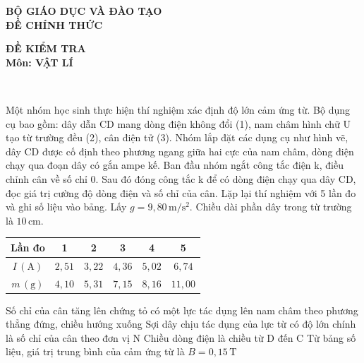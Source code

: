 \documentclass[12pt,a4paper]{article}
\begin{document}
\begin{minipage}[t]{7cm}
	\begin{center}
		\textbf{BỘ GIÁO DỤC VÀ ĐÀO TẠO \\[3pt]
			ĐỀ CHÍNH THỨC}
	\end{center}
\end{minipage}
\hspace{3cm}
\begin{minipage}[t]{7cm}
	\begin{center}
		\textbf{ĐỀ KIỂM TRA\\[3pt]
			Môn: VẬT LÍ}
	\end{center}
\end{minipage}\\[6pt]

\begin{ex}
	Một nhóm học sinh thực hiện thí nghiệm xác định độ lớn cảm ứng từ. Bộ dụng cụ bao gồm: dây dẫn CD mang dòng điện không đổi (1), nam châm hình chữ U tạo từ trường đều (2), cân điện tử (3). Nhóm lắp đặt các dụng cụ như hình vẽ, dây CD được cố định theo phương ngang giữa hai cực của nam châm, dòng điện chạy qua đoạn dây có gắn ampe kế. Ban đầu nhóm ngắt công tắc điện k, điều chỉnh cân về số chỉ 0. Sau đó đóng công tắc k để có dòng điện chạy qua dây CD, đọc giá trị cường độ dòng điện và số chỉ của cân. Lặp lại thí nghiệm với 5 lần đo và ghi số liệu vào bảng. Lấy $g = 9{,}80 \, \mathrm{m/s^2}$. Chiều dài phần dây trong từ trường là $10 \, \mathrm{cm}$.
	\begin{center}
		\begin{tabular}{|c|c|c|c|c|c|}
			\hline
			Lần đo & 1 & 2 & 3 & 4 & 5 \\
			\hline
			$I \, (\mathrm{A})$ & $2{,}51$ & $3{,}22$ & $4{,}36$ & $5{,}02$ & $6{,}74$ \\
			\hline
			$m \, (\mathrm{g})$ & $4{,}10$ & $5{,}31$ & $7{,}15$ & $8{,}16$ & $11{,}00$ \\
			\hline
		\end{tabular}
	\end{center}
	\choiceTF
	{\True Số chỉ của cân tăng lên chứng tỏ có một lực tác dụng lên nam châm theo phương thẳng đứng, chiều hướng xuống}
	{Sợi dây chịu tác dụng của lực từ có độ lớn chính là số chỉ của cân theo đơn vị N}
	{Chiều dòng điện là chiều từ D đến C}
	{Từ bảng số liệu, giá trị trung bình của cảm ứng từ là $B = 0{,}15 \, \mathrm{T}$}
	\loigiai{}
\end{ex}
\end{document}
